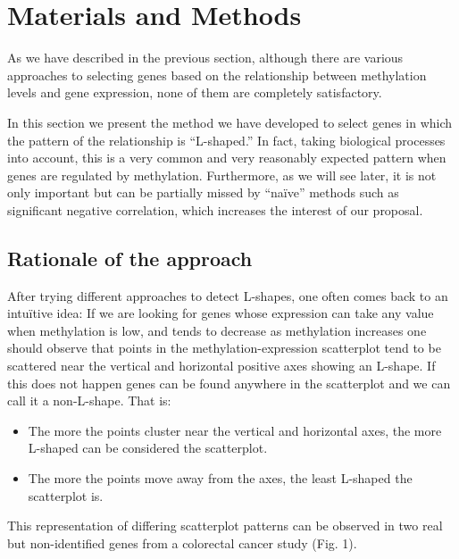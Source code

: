 \documentclass[10pt,letterpaper]{article}
\providecommand{\tightlist}{%
  \setlength{\itemsep}{0pt}\setlength{\parskip}{0pt}}
\begin{document}
\hypertarget{materials-and-methods}{%
\section{Materials and Methods}\label{materials-and-methods}}

As we have described in the previous section, although there are various
approaches to selecting genes based on the relationship between
methylation levels and gene expression, none of them are completely
satisfactory.

In this section we present the method we have developed to select genes
in which the pattern of the relationship is ``L-shaped.'' In fact,
taking biological processes into account, this is a very common and very
reasonably expected pattern when genes are regulated by methylation.
Furthermore, as we will see later, it is not only important but can be
partially missed by ``naïve'' methods such as significant negative
correlation, which increases the interest of our proposal.

\hypertarget{rationale-of-the-approach}{%
\subsection{Rationale of the approach}\label{rationale-of-the-approach}}

After trying different approaches to detect L-shapes, one often comes
back to an intuïtive idea: If we are looking for genes whose expression
can take any value when methylation is low, and tends to decrease as
methylation increases one should observe that points in the
methylation-expression scatterplot tend to be scattered near the
vertical and horizontal positive axes showing an L-shape. If this does
not happen genes can be found anywhere in the scatterplot and we can
call it a non-L-shape. That is:

\begin{itemize}
\tightlist
\item
  The more the points cluster near the vertical and horizontal axes, the
  more L-shaped can be considered the scatterplot.
\item
  The more the points move away from the axes, the least L-shaped the
  scatterplot is.
\end{itemize}

This representation of differing scatterplot patterns can be observed in
two real but non-identified genes from a colorectal cancer study (Fig.
1).
\end{document}
